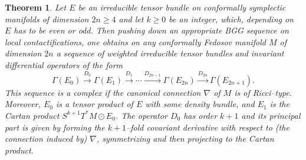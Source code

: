 \documentclass[12pt,a4paper]{amsart}
\newcommand{\Ga}{\Gamma}
\newcounter{theorem}
\numberwithin{theorem}{section}
\newtheorem{thm}[theorem]{Theorem}
\theoremstyle{definition}
\theoremstyle{remark}
\begin{document}
\begin{thm}\label{thm3.2}
Let $E$ be an irreducible tensor bundle on conformally symplectic
manifolds of dimension $2n\geq 4$ and let $k\geq 0$ be an integer,
which, depending on $E$ has to be even or odd. Then pushing down an
appropriate BGG sequence on local contactifications, one obtains on any
conformally Fedosov manifold $M$ of dimension $2n$ a sequence of
weighted irreducible tensor bundles and invariant differential
operators of the form
$$
\Ga(E_0)\overset{D_0}{\longrightarrow} \Ga(E_1)
\overset{D_1}{\longrightarrow} \cdots
\overset{D_{2n-1}}{\longrightarrow} \Ga(E_{2n}) \overset{D_{2n}}{\longrightarrow} 
\Ga(E_{2n+1}).
$$ This sequence is a complex if the canonical connection $\nabla$ of
$M$ is of Ricci--type. Moreover, $E_0$ is a tensor product of $E$ with
some density bundle, and $E_1$ is the Cartan product $S^{k+1}T^*M\odot
E_0$. The operator $D_0$ has order $k+1$ and its principal part is
given by forming the $k+1$--fold covariant derivative with respect to
(the connection induced by) $\nabla$, symmetrizing and then projecting
to the Cartan product.
\end{thm}
\end{document}
